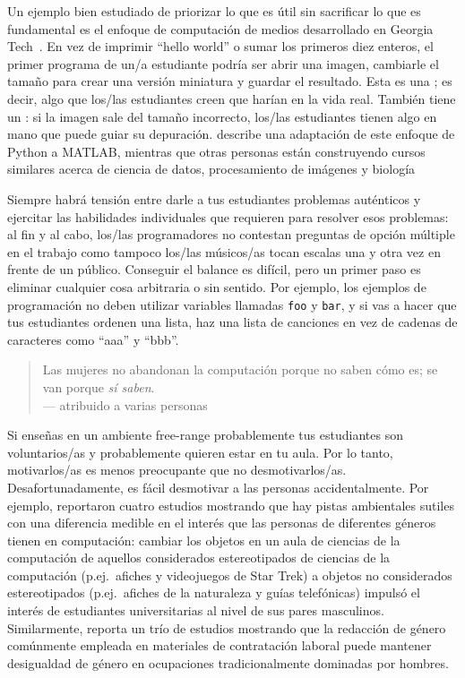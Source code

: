 Un ejemplo bien estudiado de priorizar lo que es útil
sin sacrificar lo que es fundamental
es el enfoque de computación de medios desarrollado en Georgia Tech~\cite{Guzd2013}.
En vez de imprimir ``hello world'' o sumar los primeros diez enteros,
el primer programa de un/a estudiante podría ser abrir una imagen,
cambiarle el tamaño para crear una versión miniatura
y guardar el resultado.
Esta es una ; 
es decir, algo que los/las estudiantes creen que harían en la vida real.
También tiene un :
si la imagen sale del tamaño incorrecto,
los/las estudiantes tienen algo en mano que puede guiar su depuración.
\cite{Lee2013} describe una adaptación de este enfoque de Python a MATLAB,
mientras que otras personas están construyendo cursos similares acerca de ciencia de datos, procesamiento de imágenes
y biología~\cite{Dahl2018,Meys2018,Ritz2018}

Siempre habrá tensión entre darle a tus estudiantes problemas auténticos
y ejercitar las habilidades individuales que requieren para resolver esos problemas:
al fin y al cabo,
los/las programadores no contestan preguntas de opción múltiple en el trabajo
como tampoco los/las músicos/as tocan escalas una y otra vez en frente de un público.
Conseguir el balance es difícil,
pero un primer paso es eliminar cualquier cosa arbitraria o sin sentido.
Por ejemplo,
los ejemplos de programación no deben utilizar variables llamadas \texttt{foo} y \texttt{bar},
y si vas a hacer que tus estudiantes ordenen una lista,
haz una lista de canciones en vez de cadenas de caracteres como ``aaa'' y ``bbb''.


\begin{quote}

  Las mujeres no abandonan la computación porque no saben cómo es;
  se van porque \emph{sí saben}. \\
  --- atribuido a varias personas

\end{quote}

Si enseñas en un ambiente free-range
probablemente tus estudiantes son voluntarios/as
y probablemente quieren estar en tu aula.
Por lo tanto, motivarlos/as es menos preocupante que no desmotivarlos/as.
Desafortunadamente,
es fácil desmotivar a las personas accidentalmente.
Por ejemplo,
\cite{Cher2009} reportaron cuatro estudios mostrando que
hay pistas ambientales sutiles con una diferencia medible en el interés que las personas de diferentes géneros tienen en computación:
cambiar los objetos en un aula de ciencias de la computación de aquellos considerados estereotipados de ciencias de la computación
(p.ej.\ afiches y videojuegos de Star Trek)
a objetos no considerados estereotipados (p.ej.\ afiches de la naturaleza y guías telefónicas)
impulsó el interés de estudiantes universitarias al nivel de sus pares masculinos.
Similarmente,
\cite{Gauc2011} reporta un trío de estudios mostrando que
la redacción de género comúnmente empleada en materiales de contratación laboral 
puede mantener desigualdad de género en ocupaciones tradicionalmente dominadas por hombres.

